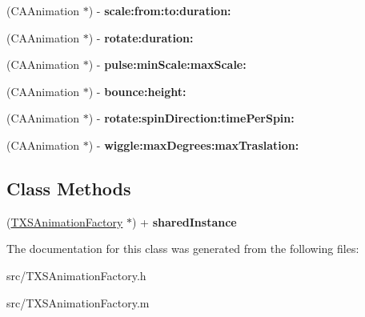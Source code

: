 \begin{DoxyCompactItemize}
\item 
\hypertarget{interface_t_x_s_animation_factory_a6b31ff0078faf49b67412835148e1159}{}(C\+A\+Animation $\ast$) -\/ {\bfseries scale\+:from\+:to\+:duration\+:}\label{interface_t_x_s_animation_factory_a6b31ff0078faf49b67412835148e1159}

\item 
\hypertarget{interface_t_x_s_animation_factory_ac6433751bd39a6dc65822b2f8960bb2d}{}(C\+A\+Animation $\ast$) -\/ {\bfseries rotate\+:duration\+:}\label{interface_t_x_s_animation_factory_ac6433751bd39a6dc65822b2f8960bb2d}

\item 
\hypertarget{interface_t_x_s_animation_factory_aa0ad6d5797a6a38161f6c2f3c6d90f60}{}(C\+A\+Animation $\ast$) -\/ {\bfseries pulse\+:min\+Scale\+:max\+Scale\+:}\label{interface_t_x_s_animation_factory_aa0ad6d5797a6a38161f6c2f3c6d90f60}

\item 
\hypertarget{interface_t_x_s_animation_factory_af78cecbf9ed03079716dad241f614301}{}(C\+A\+Animation $\ast$) -\/ {\bfseries bounce\+:height\+:}\label{interface_t_x_s_animation_factory_af78cecbf9ed03079716dad241f614301}

\item 
\hypertarget{interface_t_x_s_animation_factory_a3f23d4cf6b4e16708ef8b970b13267e8}{}(C\+A\+Animation $\ast$) -\/ {\bfseries rotate\+:spin\+Direction\+:time\+Per\+Spin\+:}\label{interface_t_x_s_animation_factory_a3f23d4cf6b4e16708ef8b970b13267e8}

\item 
\hypertarget{interface_t_x_s_animation_factory_a1501783949a7e239a24a4664af76b9d6}{}(C\+A\+Animation $\ast$) -\/ {\bfseries wiggle\+:max\+Degrees\+:max\+Traslation\+:}\label{interface_t_x_s_animation_factory_a1501783949a7e239a24a4664af76b9d6}

\end{DoxyCompactItemize}
\subsection*{Class Methods}
\begin{DoxyCompactItemize}
\item 
\hypertarget{interface_t_x_s_animation_factory_afc990ad19f0f903db1a6b1c467830ee0}{}(\hyperlink{interface_t_x_s_animation_factory}{T\+X\+S\+Animation\+Factory} $\ast$) + {\bfseries shared\+Instance}\label{interface_t_x_s_animation_factory_afc990ad19f0f903db1a6b1c467830ee0}

\end{DoxyCompactItemize}


The documentation for this class was generated from the following files\+:\begin{DoxyCompactItemize}
\item 
src/T\+X\+S\+Animation\+Factory.\+h\item 
src/T\+X\+S\+Animation\+Factory.\+m\end{DoxyCompactItemize}
